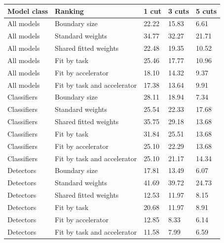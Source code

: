 \begin{tabular}{@{}lllll@{}}
\toprule
Model class & Ranking & 1 cut & 3 cuts & 5 cuts \\
\midrule
All models & Boundary size & 22.22 & 15.83 & 6.61 \\
All models & Standard weights & 34.77 & 32.27 & 21.71 \\
All models & Shared fitted weights & 22.48 & 19.35 & 10.52 \\
All models & Fit by task & 25.46 & 17.77 & 10.96 \\
All models & Fit by accelerator & 18.10 & 14.32 & 9.37 \\
All models & Fit by task and accelerator & 17.38 & 13.64 & 9.91 \\
Classifiers & Boundary size & 28.11 & 18.94 & 7.34 \\
Classifiers & Standard weights & 25.54 & 22.33 & 17.68 \\
Classifiers & Shared fitted weights & 35.75 & 29.18 & 13.68 \\
Classifiers & Fit by task & 31.84 & 25.51 & 13.68 \\
Classifiers & Fit by accelerator & 25.10 & 22.29 & 13.68 \\
Classifiers & Fit by task and accelerator & 25.10 & 21.17 & 14.34 \\
Detectors & Boundary size & 17.81 & 13.49 & 6.07 \\
Detectors & Standard weights & 41.69 & 39.72 & 24.73 \\
Detectors & Shared fitted weights & 12.53 & 11.97 & 8.15 \\
Detectors & Fit by task & 20.68 & 11.97 & 8.91 \\
Detectors & Fit by accelerator & 12.85 & 8.33 & 6.14 \\
Detectors & Fit by task and accelerator & 11.58 & 7.99 & 6.59 \\
\bottomrule
\end{tabular}
